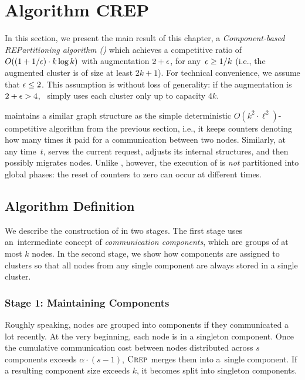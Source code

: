 
\section{Algorithm {\sc CREP}}
\label{sec:crep}

In this section, we present the main result of this chapter, a
\emph{Component-based REPartitioning algorithm (\CREP)} which achieves a
competitive ratio of $O((1 + 1/\epsilon) \cdot k \log k)$ with augmentation
$2+\epsilon$, for any~$\epsilon \geq 1/k$ (i.e., the augmented cluster
is of size at least $2k+1$). For technical convenience, we assume that 
$\epsilon \leq 2$. This assumption is without loss of generality: if the augmentation 
is $2+\epsilon > 4$, \CREP~simply uses each cluster only up to capacity $4k$.

\CREP maintains a similar graph structure as the
simple deterministic $O(k^2 \cdot \ell^2)$-competitive algorithm \DET from the
previous section, i.e., it keeps counters denoting how many times it paid for a
communication between two nodes. Similarly, at any time~$t$,
\CREP serves the current request, adjusts its internal structures, and then
possibly migrates nodes. Unlike \DET, however, the execution of \CREP is
\emph{not} partitioned into global phases: the reset of counters to zero can
occur at different times.


\subsection{Algorithm Definition}

We describe the construction of \CREP in two stages. The first stage uses
an~intermediate concept of \emph{communication components}, which are groups of at
most $k$ nodes. In the second stage, we show how components are assigned to
clusters so that all nodes from any single component are always stored in a
single cluster.


\subsubsection{Stage 1: Maintaining Components}

Roughly speaking, nodes are grouped into components if they communicated a lot
recently. At the very beginning, each node is in a singleton component. Once
the cumulative communication cost between nodes distributed across $s$
components exceeds $\alpha \cdot (s-1)$, $\textsc{Crep}$ merges them into a~single
component. If a resulting component size exceeds $k$, it becomes split
into singleton components.

